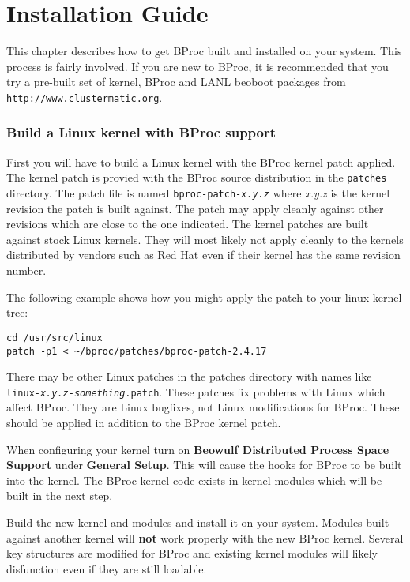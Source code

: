 \chapter{Installation Guide}

This chapter describes how to get BProc built and installed on your
system.  This process is fairly involved.  If you are new to BProc, it
is recommended that you try a pre-built set of kernel, BProc and LANL
beoboot packages from
\texttt{http://www.clustermatic.org}.

\subsection*{Build a Linux kernel with BProc support}
First you will have to build a Linux kernel with the BProc kernel
patch applied.  The kernel patch is provied with the BProc source
distribution in the \texttt{patches} directory.  The patch file is
named \texttt{bproc-patch-\emph{x.y.z}} where \emph{x.y.z} is the
kernel revision the patch is built against.  The patch may apply
cleanly against other revisions which are close to the one indicated.
The kernel patches are built against stock Linux kernels.  They will
most likely not apply cleanly to the kernels distributed by vendors
such as Red Hat even if their kernel has the same revision number.

The following example shows how you might apply the patch to your
linux kernel tree:
\begin{verbatim}
cd /usr/src/linux
patch -p1 < ~/bproc/patches/bproc-patch-2.4.17
\end{verbatim}

There may be other Linux patches in the patches directory with names
like \texttt{linux-\emph{x.y.z}-\emph{something}.patch}.  These
patches fix problems with Linux which affect BProc.  They are Linux
bugfixes, not Linux modifications for BProc.  These should be applied
in addition to the BProc kernel patch.

When configuring your kernel turn on \textbf{Beowulf Distributed
Process Space Support} under \textbf{General Setup}.  This will cause
the hooks for BProc to be built into the kernel.  The BProc kernel
code exists in kernel modules which will be built in the next step.

Build the new kernel and modules and install it on your system.
Modules built against another kernel will \textbf{not} work properly
with the new BProc kernel.  Several key structures are modified for
BProc and existing kernel modules will likely disfunction even if they
are still loadable.

